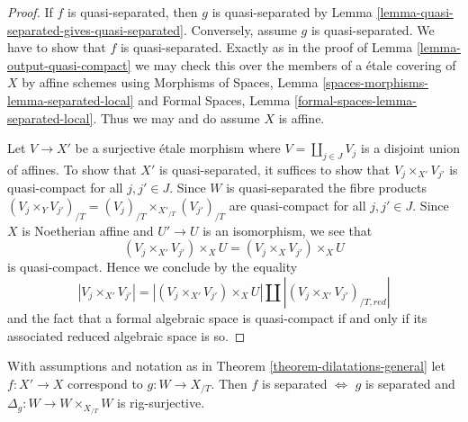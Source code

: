 \begin{proof}
If $f$ is quasi-separated, then $g$ is quasi-separated by
Lemma \ref{lemma-quasi-separated-gives-quasi-separated}.
Conversely, assume $g$ is quasi-separated. We have to show
that $f$ is quasi-separated. Exactly as in the proof
of Lemma \ref{lemma-output-quasi-compact} we may check
this over the members of a \'etale covering of $X$ by affine schemes
using Morphisms of Spaces, Lemma
\ref{spaces-morphisms-lemma-separated-local}
and Formal Spaces, Lemma
\ref{formal-spaces-lemma-separated-local}.
Thus we may and do assume $X$ is affine.

\medskip\noindent
Let $V \to X'$ be a surjective \'etale morphism
where $V = \coprod_{j \in J} V_j$ is a disjoint union of affines.
To show that $X'$ is quasi-separated, it suffices to show that
$V_j \times_{X'} V_{j'}$ is quasi-compact for all $j, j' \in J$.
Since $W$ is quasi-separated the fibre products
$(V_j \times_Y V_{j'})_{/T} = (V_j)_{/T} \times_{X'_{/T}} (V_{j'})_{/T}$
are quasi-compact for all $j, j' \in J$. Since $X$ is Noetherian affine
and $U' \to U$ is an isomorphism, we see that
$$
(V_j \times_{X'} V_{j'}) \times_X U =
(V_j \times_X V_{j'}) \times_X U
$$
is quasi-compact. Hence we conclude by the equality
$$
|V_j \times_{X'} V_{j'}| =
|(V_j \times_{X'} V_{j'}) \times_X U| \amalg
|(V_j \times_{X'} V_{j'})_{/T, red}|
$$
and the fact that a formal algebraic space is quasi-compact if and
only if its associated reduced algebraic space is so.
\end{proof}

\begin{lemma}
\label{lemma-output-separated}
With assumptions and notation as in Theorem \ref{theorem-dilatations-general}
let $f : X' \to X$ correspond to $g : W \to X_{/T}$.
Then $f$ is separated $\Leftrightarrow$ $g$ is
separated and $\Delta_g : W \to W \times_{X_{/T}} W$ is rig-surjective.
\end{lemma}

